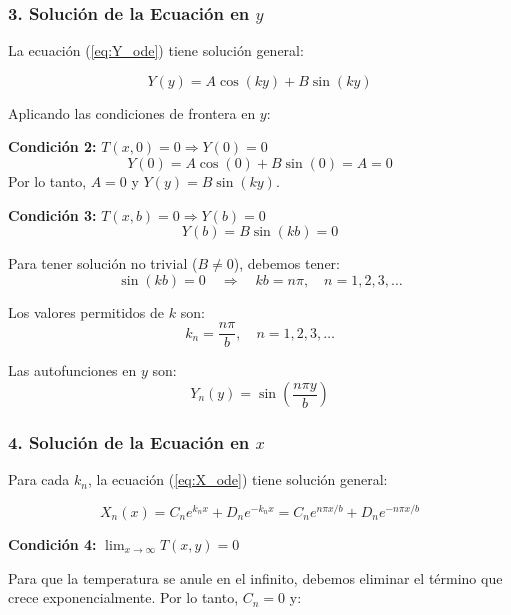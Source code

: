 \documentclass[a4paper]{article}
\begin{document}
\subsubsection{3. Solución de la Ecuación en $y$}

La ecuación (\ref{eq:Y_ode}) tiene solución general:

\begin{equation}
Y(y) = A \cos(ky) + B \sin(ky)
\end{equation}

Aplicando las condiciones de frontera en $y$:

\textbf{Condición 2:} $T(x, 0) = 0 \Rightarrow Y(0) = 0$
\begin{equation}
Y(0) = A \cos(0) + B \sin(0) = A = 0
\end{equation}
Por lo tanto, $A = 0$ y $Y(y) = B \sin(ky)$.

\textbf{Condición 3:} $T(x, b) = 0 \Rightarrow Y(b) = 0$
\begin{equation}
Y(b) = B \sin(kb) = 0
\end{equation}

Para tener solución no trivial ($B \neq 0$), debemos tener:
\begin{equation}
\sin(kb) = 0 \quad \Rightarrow \quad kb = n\pi, \quad n = 1, 2, 3, \ldots
\end{equation}

Los valores permitidos de $k$ son:
\begin{equation}
k_n = \frac{n\pi}{b}, \quad n = 1, 2, 3, \ldots
\end{equation}

Las autofunciones en $y$ son:
\begin{equation}
Y_n(y) = \sin\left(\frac{n\pi y}{b}\right)
\end{equation}

\subsubsection{4. Solución de la Ecuación en $x$}

Para cada $k_n$, la ecuación (\ref{eq:X_ode}) tiene solución general:

\begin{equation}
X_n(x) = C_n e^{k_n x} + D_n e^{-k_n x} = C_n e^{n\pi x/b} + D_n e^{-n\pi x/b}
\end{equation}

\textbf{Condición 4:} $\lim_{x \to \infty} T(x, y) = 0$

Para que la temperatura se anule en el infinito, debemos eliminar el término que crece exponencialmente. Por lo tanto, $C_n = 0$ y:
\end{document}
